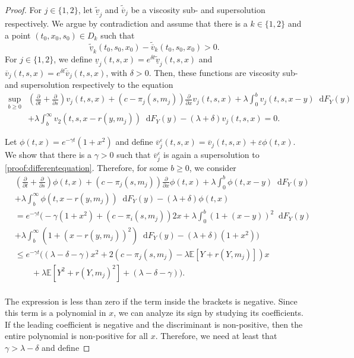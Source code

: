\documentclass[10pt,a4paper]{amsart}
\newcommand*\diff{\mathop{}\!\mathrm{d}}
\begin{document}
\begin{proof}
    For $j \in \{1,2\}$, let $\tilde{\underline{v}}_j$ and $\tilde{\overline{v}}_j$ be a viscosity sub- and supersolution respectively. We argue by contradiction and assume that there is a $k \in \{1,2\}$ and a point $(t_0,x_0,s_0) \in D_k$ such that
    \begin{equation*}
        \tilde{\underline{v}}_k(t_0,s_0,x_0)-\tilde{\overline{v}}_k(t_0,s_0,x_0)>0.
    \end{equation*}
    For $j \in \{1,2\}$, we define $\underline{v}_j(t,s,x)=e^{\delta t}\tilde{\underline{v}}_j(t,s,x)$ and $\overline{v}_j(t,s,x)=e^{\delta t}\tilde{\overline{v}}_j(t,s,x)$, with $\delta>0$. Then, these functions are viscosity sub- and supersolution respectively to the equation
    \begin{align}
    \label{proof:differentequation}
          \sup_{b\geq 0}&\left(\frac{\partial}{\partial t}+\frac{\partial}{\partial s}\right) v_j(t,s,x)+\left(c-\pi_j(s,m_j)\right)\frac{\partial}{\partial x}v_j(t,s,x) \nonumber + \lambda \int_{0}^{b}v_j(t,s,x-y)\diff F_Y(y) \nonumber \\
    &+ \lambda \int_{b}^{\infty}v_2(t,s,x-r(y,m_j))\diff F_Y(y) - (\lambda + \delta) v_j(t,s,x)=0. 
    \end{align}
    
    
    
    Let $\phi(t,x)=e^{-\gamma t}(1+x^2)$ and define $\overline{v}_j^\varepsilon(t,s,x)=\overline{v}_j(t,s,x)+\varepsilon  \phi(t,x)$. We show that there is a $\gamma>0$ such that  $\overline{v}_j^\varepsilon$ is again a supersolution to \eqref{proof:differentequation}. Therefore, for some $b\geq 0$, we consider
    \begin{align*}
       &\left(\frac{\partial}{\partial t}+\frac{\partial}{\partial s}\right) \phi(t,x)+\left(c-\pi_j(s,m_j)\right)\frac{\partial}{\partial x}\phi(t,x) \nonumber + \lambda \int_{0}^{b}\phi(t,x-y)\diff F_Y(y) \nonumber \\
    &+ \lambda \int_{b}^{\infty}\phi(t,x-r(y,m_j))\diff F_Y(y) - (\lambda+\delta) \phi(t,x)\\
    & =  e^{-\gamma t} \Big(-\gamma(1+x^2)+(c-\pi_i(s,m_j))2x + \lambda  \int_{0}^{b}(1+(x-y))^2\diff F_Y(y) \nonumber \\
    &+ \lambda \int_{b}^{\infty}(1+(x-r(y,m_j))^2)\diff F_Y(y) - (\lambda + \delta)(1+x^2)\Big)\\
    &\leq e^{-\gamma t}\Big((\lambda-\delta-\gamma)x^2 + 2(c-\pi_j(s,m_j)-\lambda\mathbb{E}[Y+r(Y,m_j)])x\\&\qquad+\lambda\mathbb{E}[Y^2+r(Y,m_j)^2]+(\lambda-\delta-\gamma) \Big).
    \end{align*}
    \\
    The expression is less than zero if the term inside the brackets is negative. Since this term is a polynomial in $x$, we can analyze its sign by studying its coefficients. If the leading coefficient is negative and the discriminant is non-positive, then the entire polynomial is non-positive for all $x$. Therefore, we need at least that $\gamma>\lambda-\delta$ and define


\end{proof}
\end{document}
